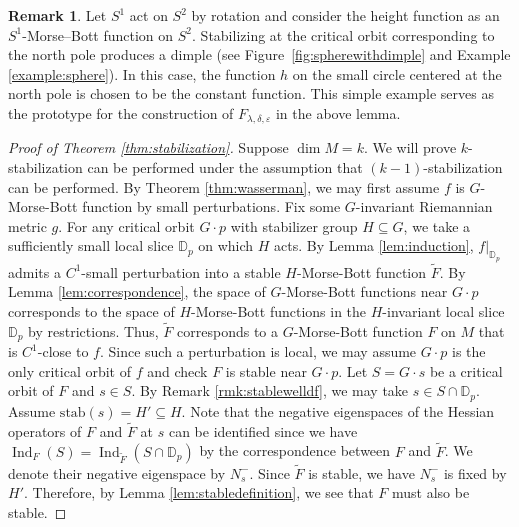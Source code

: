\documentclass[11pt]{amsart}
\theoremstyle{definition}
\newtheorem{remark}[theorem]{Remark}
\numberwithin{equation}{subsection}
\DeclareMathOperator{\ind}{Ind}
\begin{document}
\begin{remark}
 Let $S^{1}$ act on 
$S^{2}$ by rotation and consider the height function as an $S^{1}$-Morse--Bott 
function on $S^{2}$. Stabilizing at the critical orbit corresponding to the north 
pole produces a dimple (see Figure~\ref{fig:spherewithdimple} and Example \ref{example:sphere}). In this case, the 
function $h$ on the small circle centered at the north pole is chosen to be the 
constant function. This simple example serves as the prototype for the construction of $F_{\lambda,\delta,\varepsilon}$ in the above lemma.
\end{remark}



\begin{proof}[Proof of Theorem \ref{thm:stabilization}]
  Suppose $\dim M=k$. We will prove $k$-stabilization can be performed under the assumption that $(k-1)$-stabilization can be performed. By Theorem \ref{thm:wasserman}, we may first assume $f$ is $G$-Morse-Bott function by small perturbations. Fix some $G$-invariant Riemannian metric $g$. For any critical orbit $G\cdot p$ with stabilizer group $H\subseteq G$, we take a sufficiently small local slice $\mathbb{D}_p$ on which $H$ acts. By Lemma \ref{lem:induction}, $f|_{\mathbb{D}_p}$ admits a $C^1$-small perturbation into a stable $H$-Morse-Bott function $\tilde{F}$. By Lemma \ref{lem:correspondence}, the space of $G$-Morse-Bott functions near $G\cdot p$ corresponds to the space of $H$-Morse-Bott functions in the $H$-invariant local slice $\mathbb{D}_p$ by restrictions. Thus, $\tilde{F}$ corresponds to a $G$-Morse-Bott function $F$ on $M$ that is $C^1$-close to $f$. Since such a perturbation is local, we may assume $G\cdot p$ is the only critical orbit of $f$ and check $F$ is stable near $G\cdot p$. Let $S=G\cdot s$ be a critical orbit of $F$ and $s\in S$. By Remark \ref{rmk:stablewelldf}, we may take $s\in S\cap \mathbb{D}_p$. Assume $\text{stab}(s)=H'\subseteq H$. Note that the negative eigenspaces of the Hessian operators of $F$ and $\tilde{F}$ at $s$ can be identified since we have $\ind_F(S)=\ind_{\tilde{F}}(S\cap\mathbb{D}_p)$ by the correspondence between $F$ and $\tilde{F}$. We denote their negative eigenspace by $N_s^-$. Since $\tilde{F}$ is stable, we have $N_s^-$ is fixed by $H'$. Therefore, by Lemma \ref{lem:stabledefinition}, we see that $F$ must also be stable.
\end{proof}
\end{document}
